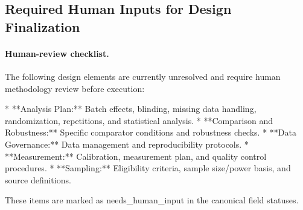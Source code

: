 \documentclass[conference]{IEEEtran}
\begin{document}
\subsection{Required Human Inputs for Design Finalization}
\paragraph{Human-review checklist.} The following design elements are currently unresolved and require human methodology review before execution:

* **Analysis Plan:** Batch effects, blinding, missing data handling, randomization, repetitions, and statistical analysis. * **Comparison and Robustness:** Specific comparator conditions and robustness checks. * **Data Governance:** Data management and reproducibility protocols. * **Measurement:** Calibration, measurement plan, and quality control procedures. * **Sampling:** Eligibility criteria, sample size/power basis, and source definitions.

These items are marked as needs\_human\_input in the canonical field statuses.
\end{document}
